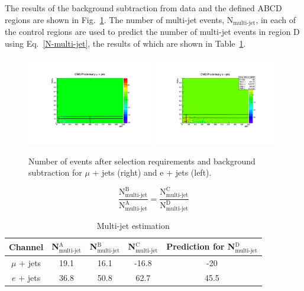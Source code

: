 The results of the background subtraction from data and the defined ABCD regions are shown in Fig.~\ref{fig:QCDplots}.
The number of multi-jet events, N$_{\textrm{multi-jet}}$, in each of the control regions are used to predict the number of multi-jet events in region D using Eq.~\ref{N-multi-jet}, the results of which are shown in Table~\ref{tab:multijet}.

\begin{figure}[!ht]
    \includegraphics[width=0.49\textwidth]{images/Run1/Data_Minus_MC_Mu_Lines2.pdf}
    \includegraphics[width=0.49\textwidth]{images/Run1/Data_Minus_MC_El_Lines2.pdf}
    \caption{Number of events after selection requirements and background subtraction for $\mu$ + jets (right) and e + jets (left).}
    \label{fig:QCDplots}
\end{figure}


\begin{equation}
\frac{\textrm{N}^{\textrm{B}}_{\textrm{multi-jet}}}{\textrm{N}^{\textrm{A}}_{\textrm{multi-jet}}} = \frac{\textrm{N}^{\textrm{C}}_{\textrm{multi-jet}}}{\textrm{N}^{\textrm{D}}_{\textrm{multi-jet}}}
\label{N-multi-jet}
\end{equation}

\begin{table}[ht!]
\caption{Multi-jet estimation}
\centering
\begin{tabular}{|c |c |c |c |c |}
 \hline 
 Channel & N$^{\textrm{A}}_{\textrm{multi-jet}}$  & N$^{\textrm{B}}_{\textrm{multi-jet}}$ & N$^{\textrm{C}}_{\textrm{multi-jet}}$ & Prediction for N$^{\textrm{D}}_{\textrm{multi-jet}}$  \\
  \hline
$\mu$ + jets & 19.1 & 16.1 & -16.8 & -20  \\
 \hline
$e$ + jets & 36.8  & 50.8 & 62.7 &45.5  \\
\hline
\end{tabular}
\label{tab:multijet}
\end{table}

